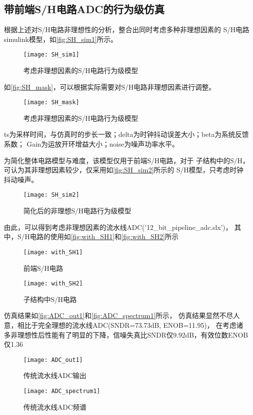 \subsection{带前端S/H电路ADC的行为级仿真}
    根据上述对S/H电路非理想性的分析，整合出同时考虑多种非理想因素的
    S/H电路simulink模型，如\autoref{fig:SH_sim1}所示。
    \begin{figure}[H]
        \centering
        \texttt{[image: SH\_sim1]}
        \caption{\label{fig:SH_sim1}考虑非理想因素的S/H电路行为级模型}
    \end{figure}
    \par 如\autoref{fig:SH_mask}，可以根据实际需要对S/H电路非理想因素进行调整。
    \begin{figure}[H]
        \centering
        \texttt{[image: SH\_mask]}
        \caption{\label{fig:SH_mask}考虑非理想因素的S/H电路行为级模型}
    \end{figure}
    ts为采样时间，与仿真时的步长一致；delta为时钟抖动误差大小；beta为系统反馈系数；
    Gain为运放开环增益大小；noise为噪声功率水平。
    \par 为简化整体电路模型与难度，该模型仅用于前端S/H电路，对于
    子结构中的S/H，可认为其非理想因素较少，仅采用如\autoref{fig:SH_sim2}所示的
    S/H模型，只考虑时钟抖动噪声。
    \begin{figure}[H]
        \centering
        \texttt{[image: SH\_sim2]}
        \caption{\label{fig:SH_sim2}简化后的非理想S/H电路行为级模型}
    \end{figure}
    \par 由此，可以得到考虑非理想因素的流水线ADC('12\_bit\_pipeline\_adc.slx')，
    其中，S/H电路的使用如\autoref{fig:with_SH1}和\autoref{fig:with_SH2}所示
    \begin{figure}[H]
        \centering
        \texttt{[image: with\_SH1]}
        \caption{\label{fig:with_SH1}前端S/H电路}
    \end{figure}
    \begin{figure}[H]
        \centering
        \texttt{[image: with\_SH2]}
        \caption{\label{fig:with_SH2}子结构中S/H电路}
    \end{figure}
    \par 仿真结果如\autoref{fig:ADC_out1}和\autoref{fig:ADC_spectrum1}所示，
    仿真结果显然不尽人意，相比于完全理想的流水线ADC(SNDR=73.73dB, ENOB=11.95)，
    在考虑诸多非理想性后性能有了明显的下降，信噪失真比SNDR仅9.92dB，有效位数ENOB仅1.36
    \begin{figure}[H]
        \centering
        \texttt{[image: ADC\_out1]}
        \caption{\label{fig:ADC_out1}传统流水线ADC输出}
    \end{figure}
    \begin{figure}[H]
        \centering
        \texttt{[image: ADC\_spectrum1]}
        \caption{\label{fig:ADC_spectrum1}传统流水线ADC频谱}
    \end{figure}

